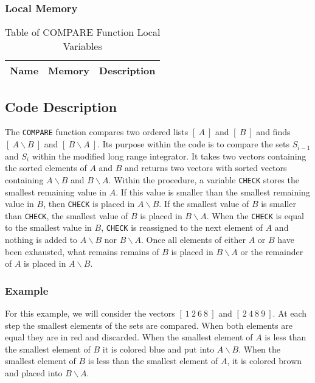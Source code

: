 \documentclass[oneside,12pt]{book}
\begin{document}
\subsubsection*{Local Memory}
\begin{center}
\begin{table}[ht]
\begin{tabular}{|c|c|p{5in}|}
\hline
\textbf{Name} & \textbf{Memory} & \textbf{Description}\\
\hline
\end{tabular}
\caption{Table of COMPARE Function Local Variables}
\end{table}
\end{center}
\subsection{Code Description}
The \texttt{COMPARE} function compares two ordered lists $[\  A \ ]$ and $[  \ B \ ]$ and finds $[  \ A  \backslash B \ ]$ and $[  \ B  \backslash A \ ]$.  Its purpose within the code is to  compare the sets $S_{i-1}$ and $S_i$ within the modified long range integrator.  It takes two vectors containing the sorted elements of $A$ and $B$ and returns two vectors with sorted vectors containing $A \backslash B$ and $B \backslash A$.  Within the procedure, a variable \texttt{CHECK} stores the smallest remaining value in $A$.  If this value is smaller than the smallest remaining value in $B$, then \texttt{CHECK} is placed in $A \backslash B$.  If the smallest value of $B$ is smaller than \texttt{CHECK}, the smallest value of $B$ is placed in $B \backslash A$.  When the \texttt{CHECK} is equal to the smallest value in $B$, \texttt{CHECK} is reassigned to the next element of $A$ and nothing is added to $A \backslash B$ nor $B \backslash A$.  Once all elements of either $A$ or $B$ have been exhausted, what remains remains of $B$ is placed in $B \backslash A$ or the remainder of $A$ is placed in $A \backslash B$.  

\newpage

\subsubsection*{Example}
For this example, we will consider the vectors $[ \ 1 \ 2 \ 6 \ 8 \ ]$ and $[ \ 2 \ 4 \ 8 \ 9 \ ]$. At each step the smallest elements of the sets are compared.  When both elements are equal they are in {\color{red} red} and discarded.  When the smallest element of $A$ is less than the smallest element of $B$ it is colored {\color{blue} blue} and put into {\color{blue} $A\backslash B$}.  When the smallest element of $B$ is less than the smallest element of $A$, it is colored {\color{brown} brown} and placed into {\color{brown} $B \backslash A$}.
\end{document}
